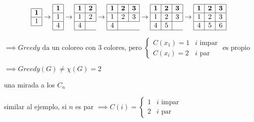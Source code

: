 \documentclass[12pt]{article}
\begin{document}
\[
\begin{array}{|c|}
\hline
\textbf{1} \\
\hline
1 \\
\hline
\end{array}
\rightarrow
\begin{array}{|c|}
\hline
\textbf{1} \\
\hline
1 \\
\hline
4 \\
\hline
\end{array}
\rightarrow
\begin{array}{|c|c|}
\hline
\textbf{1} &  \textbf{2}\\
\hline
1  & 2 \\
\hline
4 \\
\hline
\end{array}
\rightarrow
\begin{array}{|c|c|c|}
\hline
\textbf{1} &  \textbf{2} & \textbf{3} \\
\hline
1  & 2  & 3 \\
\hline
4 \\
\hline
\end{array}
\rightarrow
\begin{array}{|c|c|c|}
\hline
\textbf{1} &  \textbf{2} & \textbf{3} \\
\hline
1  & 2  & 3 \\
\hline
4  & 5 \\
\hline
\end{array}
\rightarrow
\begin{array}{|c|c|c|}
\hline
\textbf{1} &  \textbf{2} & \textbf{3} \\
\hline
1  & 2  & 3 \\
\hline
4  & 5  & 6\\
\hline
\end{array}
\]

\(
\implies Greedy \text{ da un coloreo con } 3 \text{ colores, pero } 
\begin{cases}
C(x_1) = 1 & i \text{ impar}\\
C(x_i) = 2 & i \text{ par}
\end{cases} \text{ es propio} 
\) 

\(
\implies Greedy(G) \neq \chi(G) = 2
\) \bigskip

una mirada a los $C_n$

similar al ejemplo, si $n$ es par 
\(\implies C(i) = \begin{cases} 1 & i \text{ impar} \\ 2 & i \text{ par}\end{cases}\)
\end{document}
